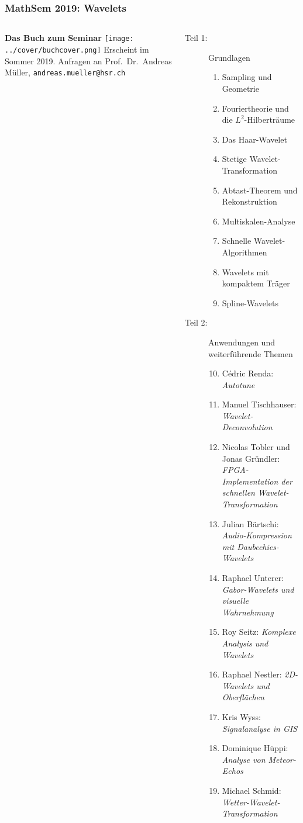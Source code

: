\documentclass[handout]{beamer}
\title[]{}
\begin{document}
\begin{frame}
\frametitle{MathSem 2019: Wavelets}
\begin{columns}[onlytextwidth]
\begin{column}{0.32\textwidth}
{\bf\large Das Buch zum Seminar}
\bigskip
\vskip 1cm
\texttt{[image: ../cover/buchcover.png]}
\vskip 0.2cm
Erscheint im Sommer 2019.
Anfragen an
Prof.~Dr.~Andreas Müller,
{\texttt{andreas.mueller@hsr.ch}}
\end{column}
\begin{column}{0.63\textwidth}
\begin{description}
\item[Teil 1:] Grundlagen
\begin{enumerate}
\item Sampling und Geometrie
\item Fouriertheorie und die $L^2$-Hilberträume
\item Das Haar-Wavelet
\item Stetige Wavelet-Transformation
\item Abtast-Theorem und Rekonstruktion
\item Multiskalen-Analyse
\item Schnelle Wavelet-Algorithmen
\item Wavelets mit kompaktem Träger
\item Spline-Wavelets
\end{enumerate}
\item[Teil 2:] Anwendungen und weiterführende Themen
\begin{enumerate}
\setcounter{enumi}{9}
\item Cédric Renda: {\em Autotune}
\item Manuel Tischhauser: {\em Wavelet-Deconvolution}
\item Nicolas Tobler und Jonas Gründler: {\em FPGA-Implementation der
schnellen Wavelet-Transformation}
\item Julian Bärtschi: {\em Audio-Kompression mit Daubechies-Wavelets}
\item Raphael Unterer: {\em Gabor-Wavelets und visuelle Wahrnehmung}
\item Roy Seitz: {\em Komplexe Analysis und Wavelets}
\item Raphael Nestler: {\em 2D-Wavelets und Oberflächen}
\item Kris Wyss: {\em Signalanalyse in GIS}
\item Dominique Hüppi: {\em Analyse von Meteor-Echos}
\item Michael Schmid: {\em Wetter-Wavelet-Transformation}
\end{enumerate}
\end{description}
\end{column}
\end{columns}
\end{frame}
\end{document}
